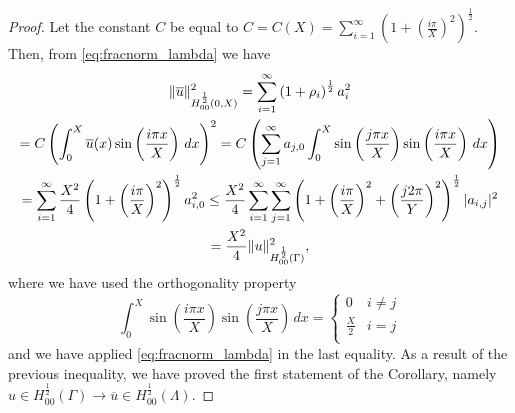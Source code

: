 \begin{proof}
Let the constant $C$ be equal to 
$C=C(X)=\sum_{i=1}^{\infty}\left( 1+ \left(\frac{i\pi}{X}\right)^2\right)^{\frac 12}$. 
Then,  from \eqref{eq:fracnorm_lambda} we have 
\begin{multline*}
\|\overline{u}\|^2_{H^{\frac 12}_{00}(0,X)}
=\sum_{i=1}^{\infty} \left( 1+ \rho_{i}\right)^{\frac 12}a_i^2
\\
=C\left( \int_0^X \overline{u}(x) \sin\left(\frac{i\pi x}{X}\right)\, dx \right)^2
= C\left( \sum_{j=1}^\infty a_{j,0}\int_0^X \sin\left(\frac{j\pi x}{X}\right) \sin\left(\frac{i\pi x}{X}\right) \, dx  \right)
\\
= \sum_{i=1}^{\infty} \frac{X^2}{4} \left( 1+ \left(\frac{i\pi}{X}\right)^2\right)^{\frac 12}a_{i,0}^2
\leq \frac{X^2}{4}\sum_{i=1}^{\infty} \sum_{j=1}^{\infty}  \left( 1+ \left(\frac{i\pi}{X}\right)^2 
+ \left(\frac{j2\pi}{Y}\right)^2\right)^{\frac 12} |a_{i,j}|^2
\\ 
=\frac{X^2}{4}\|u\|^2_{H^{\frac 12}_{00}(\Gamma)},
\end{multline*}
where we have used the orthogonality property
\begin{equation*}
\int_0^X \sin\left(\frac{i\pi x}{X}\right) \sin\left(\frac{j\pi x}{X}\right)\, dx=\begin{cases} 0 & i\neq j\\
\frac X 2 & i = j\\
\end{cases}
\end{equation*}
and we have applied \eqref{eq:fracnorm_lambda} in the last equality.
As a result of the previous inequality, we have proved the first statement of the Corollary, namely $u\in H^\frac12_{00}(\Gamma) \rightarrow \overline{u}\in H^\frac12_{00}(\Lambda)$.


\end{proof}
